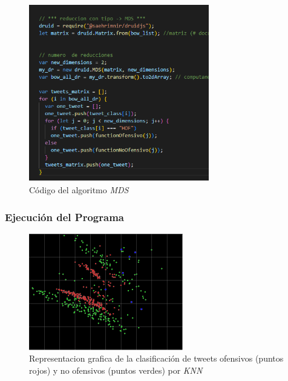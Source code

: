 \documentclass{article}
\begin{document}
\begin{figure}[h!]
	\centering
	\includegraphics[width=0.7\textwidth]{img/mds.png}
	\caption{Código del algoritmo \textit{MDS}}
	\label{fig:mds}
\end{figure}

\clearpage
\subsubsection{Ejecución del Programa}

\begin{figure}[h!]
	\centering
	\includegraphics[width=0.6\textwidth]{img/knn_05.png}
	\caption{Representacion grafica de la clasificación de tweets ofensivos (puntos rojos) y no ofensivos (puntos verdes) por \textit{KNN}}
	\label{fig:knn_05}
\end{figure}
\end{document}
